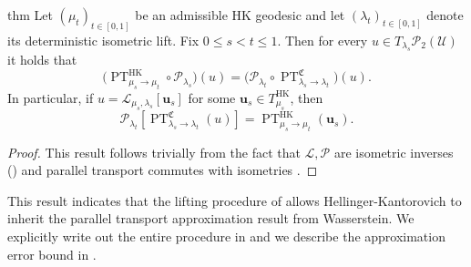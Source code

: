 \documentclass[11pt]{article}
\newcommand{\PT}{\operatorname{PT}}
\begin{document}
\begin{restatable}{thm}{} \label{commutator}
    Let $(\mu_t)_{t\in[0,1]}$ be an admissible HK geodesic and let $(\lambda_t)_{t\in[0,1]}$
    denote its deterministic isometric lift. Fix $0 \le s < t \le 1$. Then for every
    $u \in T_{\lambda_s}\mathcal{P}_2(\mathcal U)$ it holds that
    \[
    \Big(\PT^{\mathrm{HK}}_{\mu_s \rightarrow \mu_t}
    \circ \mathcal{P}_{\lambda_s}\Big)(u)
    =
    \Big(\mathcal{P}_{\lambda_t}\circ
    \PT^{\mathfrak C}_{\lambda_s \rightarrow \lambda_t}\Big)(u).
    \]
    In particular, if $u=\mathcal{L}_{\mu_s,\lambda_s}[\mathbf u_s]$ for some
    $\mathbf u_s\in T_{\mu_s}^{\mathrm{HK}}$, then
    \[
    \mathcal{P}_{\lambda_t}\!\left[\PT^{\mathfrak C}_{\lambda_s \rightarrow \lambda_t}(u)\right]
    =
    \PT^{\mathrm{HK}}_{\mu_s \rightarrow \mu_t}(\mathbf u_s).
    \]
\end{restatable}
\begin{proof}
    This result follows trivially from the fact that $\mathcal{L}, \mathcal{P}$ are isometric inverses () and parallel transport commutes with isometries \citep{gallier2013isometries}.
\end{proof}

This result indicates that the lifting procedure of  allows Hellinger-Kantorovich to inherit the parallel transport approximation result from Wasserstein. We explicitly write out the entire procedure in  and we describe the approximation error bound in . 
\end{document}
